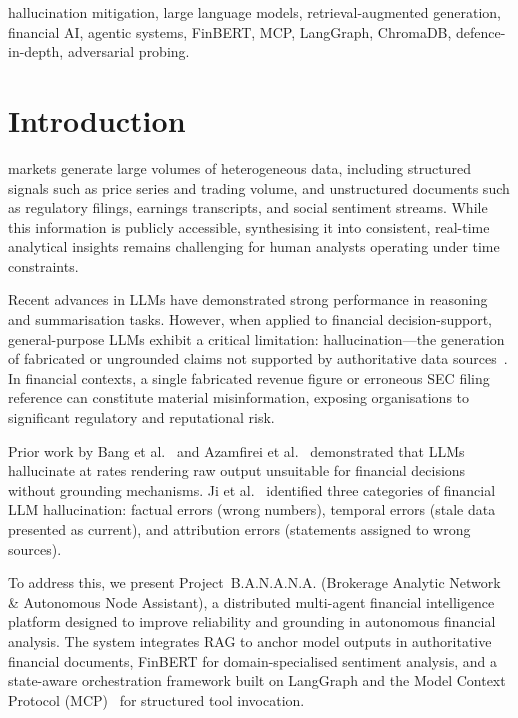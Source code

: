 \documentclass[10pt,journal,compsoc]{IEEEtran}
\newcommand{\banana}{\mbox{B.A.N.A.N.A.}}
\begin{document}
\begin{IEEEkeywords}
hallucination mitigation, large language models,
retrieval-augmented generation, financial AI, agentic systems,
FinBERT, MCP, LangGraph, ChromaDB, defence-in-depth,
adversarial probing.
\end{IEEEkeywords}

\section{Introduction}
\label{sec:intro}

 markets generate large volumes of heterogeneous data,
including structured signals such as price series and trading volume,
and unstructured documents such as regulatory filings, earnings
transcripts, and social sentiment streams.
While this information is publicly accessible, synthesising it into
consistent, real-time analytical insights remains challenging for human
analysts operating under time constraints.

Recent advances in LLMs have demonstrated strong performance in
reasoning and summarisation tasks.
However, when applied to financial decision-support, general-purpose
LLMs exhibit a critical limitation: hallucination---the generation of
fabricated or ungrounded claims not supported by authoritative data
sources~\cite{ji2023hallucination}.
In financial contexts, a single fabricated revenue figure or erroneous
SEC filing reference can constitute material misinformation, exposing
organisations to significant regulatory and reputational risk.

Prior work by Bang et al.~\cite{bang2023} and Azamfirei et al.~\cite{azamfirei2023} demonstrated that LLMs hallucinate at rates
rendering raw output unsuitable for financial decisions without
grounding mechanisms.
Ji et al.~\cite{ji2023hallucination} identified three categories of
financial LLM hallucination: factual errors (wrong numbers), temporal
errors (stale data presented as current), and attribution errors
(statements assigned to wrong sources).

To address this, we present Project~\banana{}
(Brokerage Analytic Network \& Autonomous Node Assistant), a
distributed multi-agent financial intelligence platform designed to
improve reliability and grounding in autonomous financial analysis.
The system integrates RAG to anchor model outputs in authoritative
financial documents, FinBERT for domain-specialised sentiment analysis,
and a state-aware orchestration framework built on LangGraph and the
Model Context Protocol (MCP)~\cite{mcp2024} for structured tool
invocation.
\end{document}
